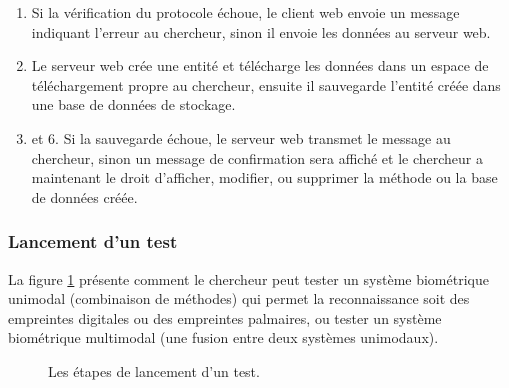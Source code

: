 \begin{enumerate}
	
	\item Si la vérification du protocole échoue, le client web envoie un message indiquant l’erreur au chercheur, sinon il envoie les données au serveur web.
	\item Le serveur web crée une entité et télécharge les données dans un espace de téléchargement propre au chercheur, ensuite il sauvegarde l’entité créée dans une base de données de stockage.
	\item et 6. Si la sauvegarde échoue, le serveur web transmet le message au chercheur, sinon un message de confirmation sera affiché et le chercheur a maintenant le droit d’afficher, modifier, ou supprimer la méthode ou la base de données créée.

	
	
\end{enumerate}
\subsubsection{Lancement d’un test }
La figure \ref{schemalancertestscenario} présente comment le chercheur peut tester un système biométrique unimodal (combinaison de méthodes) qui permet la reconnaissance soit des empreintes digitales ou des empreintes palmaires, ou tester un système biométrique multimodal (une fusion entre deux systèmes unimodaux). 
\begin{figure}[H]
	\centering
	\caption{Les étapes de lancement d'un test.}
	\label{schemalancertestscenario}
\end{figure}
